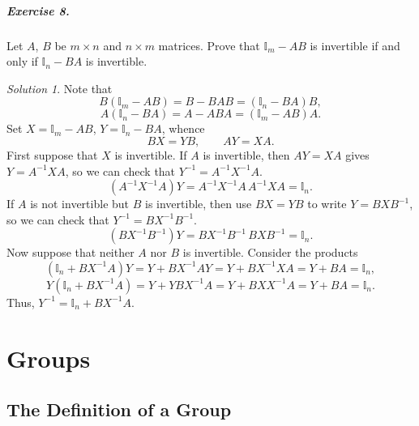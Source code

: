 \documentclass[11pt]{report}
\theoremstyle{remark}
\newtheorem*{solution}{Solution}
\begin{document}
    \paragraph{Exercise 8.} Let $A$, $B$ be $m \times n$ and $n \times m$ matrices.
    Prove that $\mathbb{I}_m - AB$ is invertible if and only if $\mathbb{I}_n - BA$
    is invertible.
    \begin{solution}
        Note that \[
            B(\mathbb{I}_m - AB) = B - BAB = (\mathbb{I}_n - BA)B,
        \]\[
            A(\mathbb{I}_n - BA) = A - ABA = (\mathbb{I}_m - AB)A.
        \] Set $X = \mathbb{I}_m - AB$, $Y = \mathbb{I}_n - BA$, whence \[
            BX = YB, \qquad AY = XA.
        \] First suppose that $X$ is invertible. If $A$ is invertible, then $AY =
        XA$ gives $Y = A^{-1}XA$, so we can check that $Y^{-1} = A^{-1}X^{-1}A$. \[
            (A^{-1}X^{-1}A)Y = A^{-1}X^{-1}A\, A^{-1}X A = \mathbb{I}_n.
        \] If $A$ is not invertible but $B$ is invertible, then use $BX = YB$ to
        write $Y = BXB^{-1}$, so we can check that $Y^{-1} = BX^{-1}B^{-1}$. \[
            (BX^{-1}B^{-1})Y = BX^{-1}B^{-1}\, BXB^{-1} = \mathbb{I}_n.
        \] Now suppose that neither $A$ nor $B$ is invertible. Consider the products
        \[
            (\mathbb{I}_n + BX^{-1}A)Y = Y + BX^{-1}AY = Y + BX^{-1}XA = Y + BA =
            \mathbb{I}_n, \] \[
            Y(\mathbb{I}_n + BX^{-1}A) = Y + YBX^{-1}A = Y + BXX^{-1}A = Y + BA =
            \mathbb{I}_n.
        \] Thus, $Y^{-1} = \mathbb{I}_n + BX^{-1}A$.
    \end{solution}
    


    \chapter{Groups}

    \section{The Definition of a Group}
    
\end{document}
